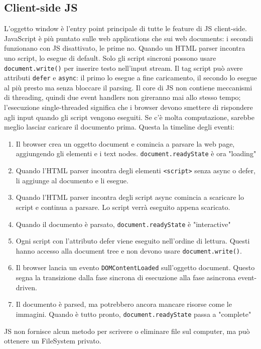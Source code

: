 \documentclass[11pt]{article}
\newcommand{\code}[1]{\texttt{#1}}
\begin{document}
\subsection{Client-side JS}
L'oggetto window è l'entry point principale di tutte le feature di JS client-side. JavaScript è più puntato sulle web applications che sui web documents: i secondi funzionano con JS disattivato, le prime no. Quando un HTML parser incontra uno script, lo esegue di default. Solo gli script sincroni possono usare \code{document.write()} per inserire testo nell'input stream. Il tag script può avere attributi \code{defer} e \code{async}: il primo lo esegue a fine caricamento, il secondo lo esegue al più presto ma senza bloccare il parsing. Il core di JS non contiene meccanismi di threading, quindi due event handlers non gireranno mai allo stesso tempo; l'esecuzione single-threaded significa che i browser devono smettere di rispondere agli input quando gli script vengono eseguiti. Se c'è molta computazione, sarebbe meglio lasciar caricare il documento prima. Questa la timeline degli eventi:
\begin{enumerate}
    \item Il browser crea un oggetto document e comincia a parsare la web page, aggiungendo gli elementi e i text nodes. \code{document.readyState} è ora "loading"
    \item Quando l'HTML parser incontra degli elementi \code{<script>} senza async o defer, li aggiunge al documento e li esegue. 
    \item Quando l'HTML parser incontra degli script async comincia a scaricare lo script e continua a parsare. Lo script verrà eseguito appena scaricato.
    \item Quando il documento è parsato, \code{document.readyState} è "interactive"
    \item Ogni script con l'attributo defer viene eseguito nell'ordine di lettura. Questi hanno accesso alla document tree e non devono usare \code{document.write()}. 
    \item Il browser lancia un evento \code{DOMContentLoaded} sull'oggetto document. Questo segna la transizione dalla fase sincrona di esecuzione alla fase asincrona event-driven. 
    \item Il documento è parsed, ma potrebbero ancora mancare risorse come le immagini. Quando è tutto pronto, \code{document.readyState} passa a "complete"
\end{enumerate}
JS non fornisce alcun metodo per scrivere o eliminare file sul computer, ma può ottenere un FileSystem privato. 
\end{document}

